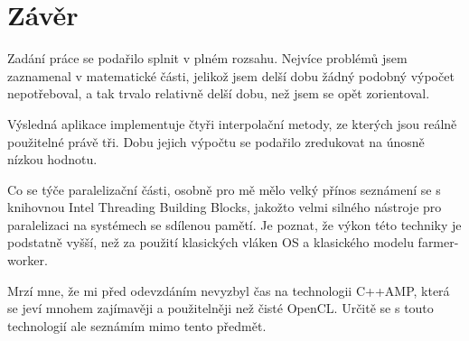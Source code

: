 \documentclass[]{thesiskiv}
\begin{document}
\chapter{Závěr}

Zadání práce se podařilo splnit v plném rozsahu. Nejvíce problémů jsem zaznamenal v matematické části, jelikož jsem delší dobu žádný podobný výpočet nepotřeboval, a tak trvalo relativně delší dobu, než jsem se opět zorientoval.

Výsledná aplikace implementuje čtyři interpolační metody, ze kterých jsou reálně použitelné právě tři. Dobu jejich výpočtu se podařilo zredukovat na únosně nízkou hodnotu.

Co se týče paralelizační části, osobně pro mě mělo velký přínos seznámení se s knihovnou Intel Threading Building Blocks, jakožto velmi silného nástroje pro paralelizaci na systémech se sdílenou pamětí. Je poznat, že výkon této techniky je podstatně vyšší, než za použití klasických vláken OS a klasického modelu farmer-worker.

Mrzí mne, že mi před odevzdáním nevyzbyl čas na technologii C++AMP, která se jeví mnohem zajímavěji a použitelněji než čisté OpenCL. Určitě se s touto technologií ale seznámím mimo tento předmět.
\end{document}
